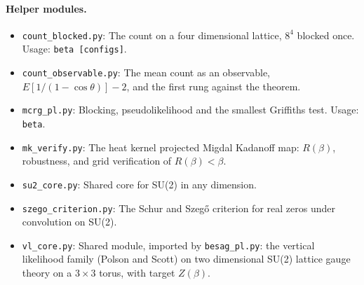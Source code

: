 \paragraph{Helper modules.}\nopagebreak
\begin{itemize}\setlength{\itemsep}{0pt}\setlength{\parskip}{0pt}
\item \texttt{count\_blocked.py}: The count on a four dimensional lattice, $8^4$ blocked once. Usage: \texttt{beta [configs]}.
\item \texttt{count\_observable.py}: The mean count as an observable, $E[1/(1-\cos\theta)]-2$, and the first rung against the theorem.
\item \texttt{mcrg\_pl.py}: Blocking, pseudolikelihood and the smallest Griffiths test. Usage: \texttt{beta}.
\item \texttt{mk\_verify.py}: The heat kernel projected Migdal Kadanoff map: $R(\beta)$, robustness, and grid verification of $R(\beta)<\beta$.
\item \texttt{su2\_core.py}: Shared core for SU(2) in any dimension.
\item \texttt{szego\_criterion.py}: The Schur and Szeg\H o criterion for real zeros under convolution on SU(2).
\item \texttt{vl\_core.py}: Shared module, imported by \texttt{besag\_pl.py}: the vertical likelihood family (Polson and Scott) on two dimensional SU(2) lattice gauge theory on a $3\times 3$ torus, with target $Z(\beta)$.
\end{itemize}

\endgroup
